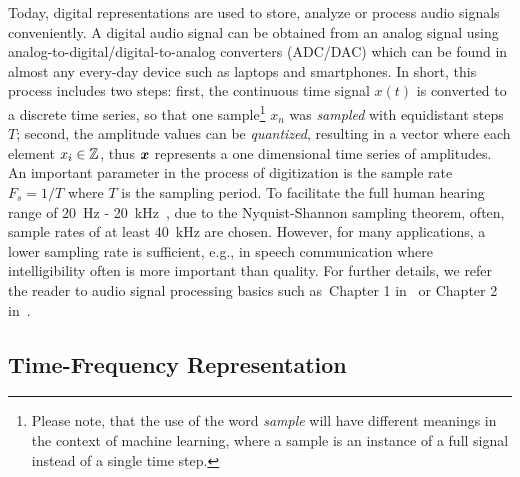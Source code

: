 Today, digital representations are used to store, analyze or process audio signals conveniently.
A digital audio signal can be obtained from an analog signal using analog-to-digital/digital-to-analog converters (ADC/DAC) which can be found in almost any every-day device such as laptops and smartphones.
In short, this process includes two steps: first, the continuous time signal \(x(t)\) is converted to a discrete time series, so that one sample\footnote{Please note, that the use of the word \emph{sample} will have different meanings in the context of machine learning, where a sample is an instance of a full signal instead of a single time step.} \(x_n\) was \emph{sampled} with equidistant steps \(T\); second, the amplitude values can be \emph{quantized}, resulting in a vector where each element \(x_i \in {\mathbb{Z}}\), thus \({\bm{x}}\) represents a one dimensional time series of amplitudes.
An important parameter in the process of digitization is the sample rate \(F_s = 1/T\) where \(T\) is the sampling period.
To facilitate the full human hearing range of 20~\si{\hertz} - 20~\si{\kilo\hertz}~\cite{fastl90, moore89}, due to the Nyquist-Shannon sampling theorem, often, sample rates of at least 40~\si{\kilo\hertz} are chosen.
However, for many applications, a lower sampling rate is sufficient, e.g., in speech communication where intelligibility often is more important than quality.
For further details, we refer the reader to audio signal processing basics such as~Chapter 1 in~\cite{proakis96} or Chapter 2 in~\cite{Mueller15}.

\hypertarget{time-frequency-representation}{%
\subsection{Time-Frequency Representation}\label{sub:time-frequency-representation}}

